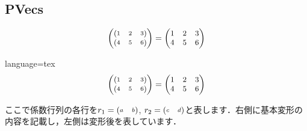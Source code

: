 \documentclass[../main]{subfiles}
\begin{document}
\subsection{PVecs}

\[
    \PMat{\PVecs{1&2&3}\\\PVecs{4&5&6}} =
    \PMat{1&2&3\\4&5&6}
\]
\begin{Code}{language=tex}
\[
    \PMat{\PVecs{1&2&3}\\\PVecs{4&5&6}} =
    \PMat{1&2&3\\4&5&6}
\]
\end{Code}

\HRuleLeader

ここで係数行列の各行を$r_1 = {\scriptsize\begin{pmatrix}a&b\end{pmatrix}}$, $r_2 = {\scriptsize\begin{pmatrix}c&d\end{pmatrix}}$と表します．右側に基本変形の内容を記載し，左側は変形後を表しています．
\end{document}
